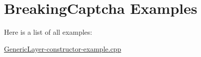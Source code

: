 \section{Breaking\-Captcha Examples}
Here is a list of all examples:\begin{CompactItemize}
\item 
\hyperlink{GenericLayer-constructor-example_8cpp-example}{Generic\-Layer-constructor-example.cpp}
\end{CompactItemize}
